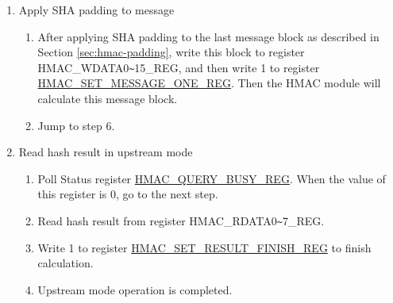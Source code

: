 \documentclass[main\_\_EN.tex]{subfiles}
\begin{document}
\begin{enumerate}
\begin{enumerate}
\begin{itemize}
\begin{enumerate}
                \item If Block\_\textcolor{red}{n} is the only message block, \begin{math}n=1\end{math}, and Block\_\textcolor{red}{1} has included all padding bits, write 1 to register \hyperref[regdesc:HMACONEBLOCKREG]{HMAC\_ONE\_BLOCK\_REG}, and then jump to step 6.
                \item If Block\_\textcolor{red}{n} is the second to last padded block, write 1 to register\\ \hyperref[regdesc:HMACSETMESSAGEPADREG]{HMAC\_SET\_MESSAGE\_PAD\_REG}, and then jump to step 5.
                \item If Block\_\textcolor{red}{n} is neither the last nor the second to last message block, write 1 to register \\\hyperref[regdesc:HMACSETMESSAGEINGREG]{HMAC\_SET\_MESSAGE\_ING\_REG} and define $n=n+1$, and then jump to step 4.(b).
            \end{enumerate}
        \end{itemize}
    \end{enumerate}

    \item Apply SHA padding to message
    \begin{enumerate}
        \item After applying SHA padding to the last message block as described in Section \ref{sec:hmac-padding}, write this block to register HMAC\_WDATA0\verb+~+15\_REG, and then write 1 to register \hyperref[regdesc:HMACSETMESSAGEONEREG]{HMAC\_SET\_MESSAGE\_ONE\_REG}. Then the HMAC module will calculate this message block.
        \item Jump to step 6.
    \end{enumerate}

    \item Read hash result in upstream mode
    \begin{enumerate}
        \item Poll Status register \hyperref[regdesc:HMACQUERYBUSYREG]{HMAC\_QUERY\_BUSY\_REG}. When the value of this register is 0, go to the next step.
        \item Read hash result from register HMAC\_RDATA0\verb+~+7\_REG.
        \item Write 1 to register \hyperref[regdesc:HMACSETRESULTFINISHREG]{HMAC\_SET\_RESULT\_FINISH\_REG} to finish calculation.
        \item Upstream mode operation is completed.
    \end{enumerate}

\end{enumerate}
\end{document}
